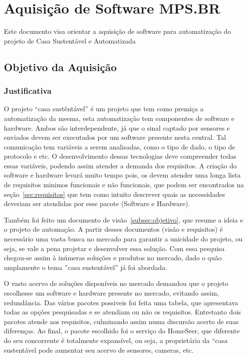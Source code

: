 \chapter{Aquisição de Software MPS.BR}

\begin{center}
	Este documento visa orientar a aquisição de software para automatização do projeto de Casa Sustentável e Automatizada
\end{center}

\section{Objetivo da Aquisição}

\subsection{Justificativa}

	O projeto “casa sustêntável” é um projeto  que tem como premiça a automatização da mesma, esta automatização tem componentes de software e hardware. Ambos são interdependente, já que o sinal captado por sensores e enviados devem ser executados por um software presente nesta central. Tal comunicação tem variáveis a serem analisadas, como o tipo de dado, o tipo de protocolo e etc. O desenvolvimento dessas tecnologias deve compreender todas essas variáveis, podendo assim atender a demanda dos requisitos. A criação do software e hardware levará muito tempo pois, os devem atender uma longa lista de requisitos minimos funcionais e não funcionais, que podem ser encontrados na seção~\ref{sec:requisitos} que tem como intuito descrever quais as necessidades deveriam ser atendidas por esse pacote (Software e Hardware).

	Também foi feito um documento de visão~\ref{subsec:objetivo}, que resume a ideia e o projeto de automação. A partir desses documentos (visão e requisitos) é necessário uma vasta busca no mercado para garantir a unicidade do projeto, ou seja, se vale a pena projetar e desenvolver essa solução. Com essa pesquisa chegou-se assim à inúmeras soluções e produtos no mercado, dado o quão amplamente o tema ”casa sustentável” já foi abordada.

	O vasto acervo de soluções disponíveis no mercado demandou que o projeto escolhesse um  software e hardware presente no mercado, evitando assim, redundância. Das vários pacotes possiveis foi feita uma tabela, que apresentava todas as opções pesquisadas e se atendiam ou não os requisitos. Entretanto dois pacotes atende aos requisitos, culminando  assim numa discursão acerto de suas diferenças. Ao final, o pacote escolhido foi o serviço do HomeSeer, que diferente do seu concorrente é totalmente expansível, ou seja, a proprietária da “casa sustentável pode aumentar seu acervo de sensores, cameras, etc.

